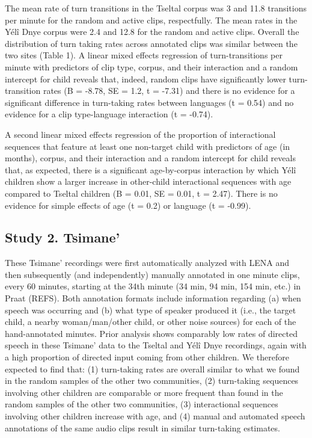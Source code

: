 \documentclass[10pt, letterpaper]{article}
\begin{document}
The mean rate of turn transitions in the Tseltal corpus was 3 and 11.8
transitions per minute for the random and active clips, respectfully.
The mean rates in the Yélî Dnye corpus were 2.4 and 12.8 for the random
and active clips. Overall the distribution of turn taking rates across
annotated clips was similar between the two sites (Table 1). A linear
mixed effects regression of turn-transitions per minute with predictors
of clip type, corpus, and their interaction and a random intercept for
child reveals that, indeed, random clips have significantly lower
turn-transition rates (B = -8.78, SE = 1.2, t = -7.31) and there is no
evidence for a significant difference in turn-taking rates between
languages (t = 0.54) and no evidence for a clip type-language
interaction (t = -0.74).

A second linear mixed effects regression of the proportion of
interactional sequences that feature at least one non-target child with
predictors of age (in months), corpus, and their interaction and a
random intercept for child reveals that, as expected, there is a
significant age-by-corpus interaction by which Yélî children show a
larger increase in other-child interactional sequences with age compared
to Tseltal children (B = 0.01, SE = 0.01, t = 2.47). There is no
evidence for simple effects of age (t = 0.2) or language (t = -0.99).

\hypertarget{study-2.-tsimane}{%
\subsection{Study 2. Tsimane'}\label{study-2.-tsimane}}

These Tsimane' recordings were first automatically analyzed with LENA
and then subsequently (and independently) manually annotated in one
minute clips, every 60 minutes, starting at the 34th minute (34 min, 94
min, 154 min, etc.) in Praat (REFS). Both annotation formats include
information regarding (a) when speech was occurring and (b) what type of
speaker produced it (i.e., the target child, a nearby woman/man/other
child, or other noise sources) for each of the hand-annotated minutes.
Prior analysis shows comparably low rates of directed speech in these
Tsimane' data to the Tseltal and Yélî Dnye recordings, again with a high
proportion of directed input coming from other children. We therefore
expected to find that: (1) turn-taking rates are overall similar to what
we found in the random samples of the other two communities, (2)
turn-taking sequences involving other children are comparable or more
frequent than found in the random samples of the other two communities,
(3) interactional sequences involving other children increase with age,
and (4) manual and automated speech annotations of the same audio clips
result in similar turn-taking estimates.
\end{document}
